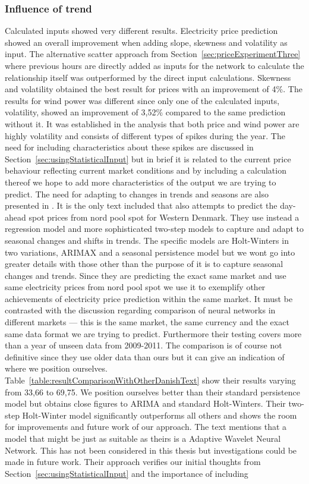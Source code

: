 \subsubsection{Influence of trend}
\label{sec:influenceOfTrendInCalcInput}
Calculated inputs showed very different results. Electricity price prediction showed an overall improvement when adding slope, skewness and volatility as input. The alternative scatter approach from Section~\ref{sec:priceExperimentThree} where previous hours are directly added as inputs for the network to calculate the relationship itself was outperformed by the direct input calculations. Skewness and volatility obtained the best result for prices with an improvement of 4\%. The results for wind power was different since only one of the calculated inputs, volatility, showed an improvement of 3,52\% compared to the same prediction without it. It was established in the analysis that both price and wind power are highly volatility and consists of different types of spikes during the year. The need for including characteristics about these spikes are discussed in Section~\ref{sec:usingStatisticalInput} but in brief it is related to the current price behaviour reflecting current market conditions and by including a calculation thereof we hope to add more characteristics of the output we are trying to predict. The need for adapting to changes in trends and seasons are also presented in \cite{forecastingSpotPricesAccountingForWindPower}. It is the only text included that also attempts to predict the day-ahead spot prices from nord pool spot for Western Denmark. They use instead a regression model and more sophisticated two-step models to capture and adapt to seasonal changes and shifts in trends. The specific models are Holt-Winters in two variations, ARIMAX and a seasonal persistence model but we wont go into greater details with those other than the purpose of it is to capture seasonal changes and trends. Since they are predicting the exact same market and use same electricity prices from nord pool spot we use it to exemplify other achievements of electricity price prediction within the same market. It must be contrasted with the discussion regarding comparison of neural networks in different markets --- this is the same market, the same currency and the exact same data format we are trying to predict. Furthermore their testing covers more than a year of unseen data from 2009-2011. The comparison is of course not definitive since they use older data than ours but it can give an indication of where we position ourselves. Table~\ref{table:resultComparisonWithOtherDanishText} show their results varying from 33,66 to 69,75. We position ourselves better than their standard persistence model but obtains close figures to ARIMA and standard Holt-Winters. Their two-step Holt-Winter model significantly outperforms all others and shows the room for improvements and future work of our approach. The text mentions that a model that might be just as suitable as theirs is a Adaptive Wavelet Neural Network. This has not been considered in this thesis but investigations could be made in future work. Their approach verifies our initial thoughts from Section~\ref{sec:usingStatisticalInput} and the importance of including 